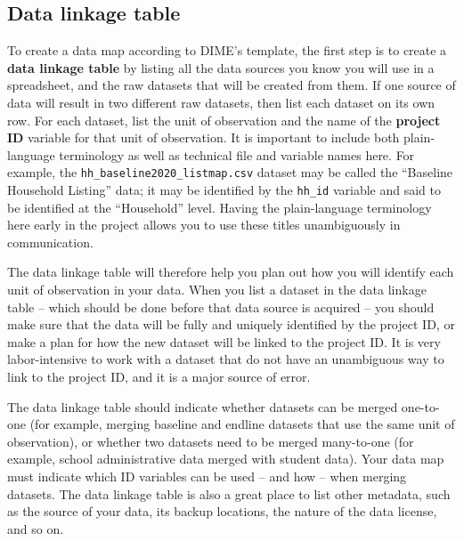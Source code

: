 \subsection{Data linkage table}

To create a data map according to DIME's template,
the first step is to create a \textbf{data linkage table} by listing
all the data sources you know you will use in a spreadsheet,
and the raw datasets that will be created from them.
If one source of data will result in two different raw datasets,
then list each dataset on its own row.
For each dataset, list the unit of observation
and the name of the \textbf{project ID}
variable for that unit of observation.
It is important to include both plain-language terminology
as well as technical file and variable names here.
For example, the \texttt{hh\_baseline2020\_listmap.csv} dataset
may be called the ``Baseline Household Listing'' data;
it may be identified by the \texttt{hh\_id} variable
and said to be identified at the ``Household'' level.
Having the plain-language terminology here early in the project
allows you to use these titles unambiguously in communication.

The data linkage table will therefore help you plan out
how you will identify each unit of observation in your data.
When you list a dataset in the data linkage table --
which should be done before that data source is acquired --
you should make sure that the data will
be fully and uniquely identified by the project ID,
or make a plan for how the new dataset will be linked to the project ID.
It is very labor-intensive to work with a dataset that
do not have an unambiguous way to link to the project ID,
and it is a major source of error.

The data linkage table should indicate whether
datasets can be merged one-to-one (for example,
merging baseline and endline datasets
that use the same unit of observation),
or whether two datasets need to be merged many-to-one
(for example, school administrative data merged with student data).
Your data map must indicate which ID variables
can be used -- and how -- when merging datasets.
The data linkage table is also a great place to list other metadata,
such as the source of your data, its backup locations,
the nature of the data license, and so on.

